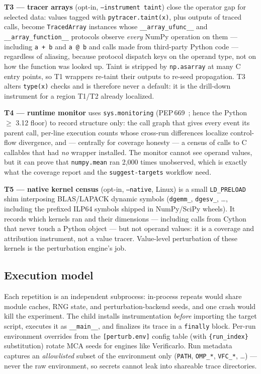 \textbf{T3 --- tracer arrays} (opt-in, \texttt{--instrument taint}) close
the operator gap for selected data: values tagged with
\texttt{pytracer.taint(x)}, plus outputs of traced calls, become
\texttt{TracedArray} instances whose \texttt{\_\_array\_ufunc\_\_} and
\texttt{\_\_array\_function\_\_} protocols observe \emph{every} NumPy
operation on them --- including \texttt{a + b} and \texttt{a @ b} and
calls made from third-party Python code --- regardless of aliasing,
because protocol dispatch keys on the operand type, not on how the
function was looked up. Taint is stripped by \texttt{np.asarray} at many
C entry points, so T1 wrappers re-taint their outputs to re-seed
propagation. T3 alters \texttt{type(x)} checks and is therefore never a
default: it is the drill-down instrument for a region T1/T2 already
localized.

\textbf{T4 --- runtime monitor} uses \texttt{sys.monitoring}
(PEP\,669~\citep{pep669}; hence the Python $\geq$ 3.12 floor) to record
structure only: the call graph that gives every event its parent call,
per-line execution counts whose cross-run differences localize
control-flow divergence, and --- centrally for coverage honesty --- a
census of calls to C callables that had \emph{no} wrapper installed. The
monitor cannot see operand values, but it can prove that
\texttt{numpy.mean} ran 2{,}000 times unobserved, which is exactly what
the coverage report and the \texttt{suggest-targets} workflow need.

\textbf{T5 --- native kernel census} (opt-in, \texttt{--native}, Linux)
is a small \texttt{LD\_PRELOAD} shim interposing BLAS/LAPACK dynamic
symbols (\texttt{dgemm\_}, \texttt{dgesv\_}, \ldots, including the
prefixed ILP64 symbols shipped in NumPy/SciPy wheels). It records which
kernels ran and their dimensions --- including calls from Cython that
never touch a Python object --- but not operand values: it is a coverage
and attribution instrument, not a value tracer. Value-level perturbation
of these kernels is the perturbation engine's job.

\subsection{Execution model}
\label{sec:design-exec}

Each repetition is an independent subprocess: in-process repeats would
share module caches, RNG state, and perturbation-backend seeds, and one
crash would kill the experiment. The child installs instrumentation
\emph{before} importing the target script, executes it as
\texttt{\_\_main\_\_}, and finalizes its trace in a \texttt{finally}
block. Per-run environment overrides from the \texttt{[perturb.env]}
config table (with \texttt{\{run\_index\}} substitution) rotate MCA seeds
for engines like Verificarlo. Run metadata captures an
\emph{allowlisted} subset of the environment only (\texttt{PATH},
\texttt{OMP\_*}, \texttt{VFC\_*}, \ldots) --- never the raw environment,
so secrets cannot leak into shareable trace directories.

